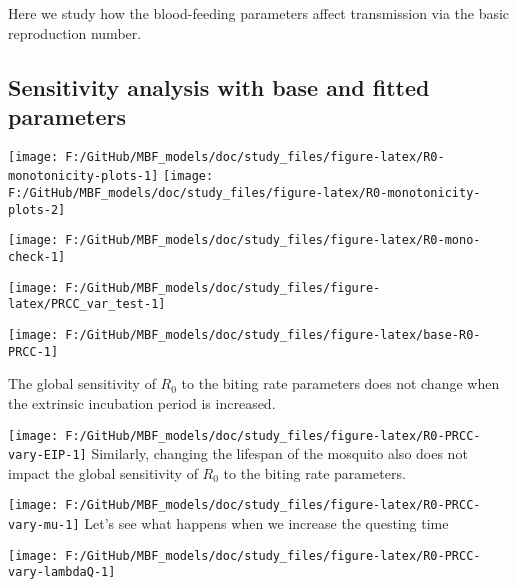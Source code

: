 \documentclass[
]{article}
\begin{document}
Here we study how the blood-feeding parameters affect transmission via
the basic reproduction number.

\subsection{Sensitivity analysis with base and fitted
parameters}\label{sensitivity-analysis-with-base-and-fitted-parameters}

\texttt{[image: F:/GitHub/MBF\_models/doc/study\_files/figure-latex/R0-monotonicity-plots-1]}
\texttt{[image: F:/GitHub/MBF\_models/doc/study\_files/figure-latex/R0-monotonicity-plots-2]}

\texttt{[image: F:/GitHub/MBF\_models/doc/study\_files/figure-latex/R0-mono-check-1]}

\texttt{[image: F:/GitHub/MBF\_models/doc/study\_files/figure-latex/PRCC\_var\_test-1]}

\texttt{[image: F:/GitHub/MBF\_models/doc/study\_files/figure-latex/base-R0-PRCC-1]}

The global sensitivity of \(R_0\) to the biting rate parameters does not
change when the extrinsic incubation period is increased.

\texttt{[image: F:/GitHub/MBF\_models/doc/study\_files/figure-latex/R0-PRCC-vary-EIP-1]}
Similarly, changing the lifespan of the mosquito also does not impact
the global sensitivity of \(R_0\) to the biting rate parameters.

\texttt{[image: F:/GitHub/MBF\_models/doc/study\_files/figure-latex/R0-PRCC-vary-mu-1]}
Let's see what happens when we increase the questing time

\texttt{[image: F:/GitHub/MBF\_models/doc/study\_files/figure-latex/R0-PRCC-vary-lambdaQ-1]}
\end{document}
